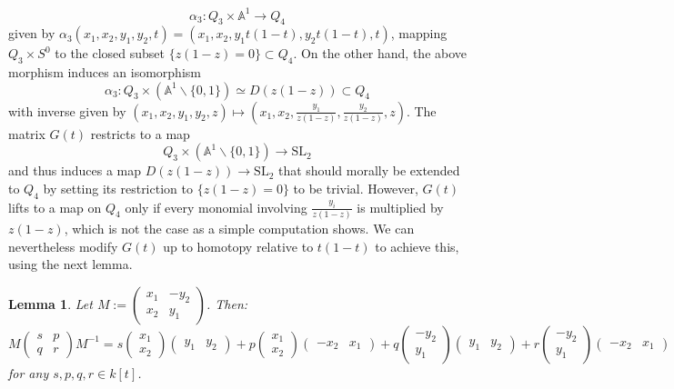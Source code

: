 \documentclass[11pt,leqno]{article}
\newcommand{\A}{{\mathbb A}}
\renewcommand{\1}{{\rm 1\hspace*{-0.4ex}%
\rule{0.1ex}{1.52ex}\hspace*{0.2ex}}}
\newcommand{\<}[1]{{\langle}#1 {\rangle}}
\theoremstyle{plain}
\newtheorem{lem}[thm]{Lemma}
\theoremstyle{definition}
\theoremstyle{remark}
\numberwithin{equation}{section}
\begin{document}
\[
\alpha_3\colon Q_3\times \A^1\to Q_4
\]
given by $\alpha_3(x_1,x_2,y_1,y_2,t)=(x_1,x_2,y_1t(1-t),y_2t(1-t),t)$, mapping $ Q_3\times S^0$ to the closed subset  $\{z(1-z)=0\}\subset Q_4$. On the other hand, the above morphism induces an isomorphism 
\[
\alpha_3\colon Q_3\times (\A^1\smallsetminus \{0,1\})\simeq D(z(1-z))\subset Q_4
\]
with inverse given by $(x_1,x_2,y_1,y_2,z)\mapsto (x_1,x_2,\frac{y_1}{z(1-z)},\frac{y_2}{z(1-z)},z)$. The matrix $G(t)$ restricts to a map
\[
Q_3\times (\A^1\smallsetminus \{0,1\})\to \mathrm{SL}_2
\]
and thus induces a map $D(z(1-z))\to \mathrm{SL}_2$ that should morally be extended to $Q_4$ by setting its restriction to $\{z(1-z)=0\}$ to be trivial. However, $G(t)$ lifts to a map on $Q_4$ only if every monomial involving $\frac{y_i}{z(1-z)}$ is multiplied by $z(1-z)$, which is not the case as a simple computation shows. We can nevertheless modify $G(t)$ up to homotopy relative to $t(1-t)$ to achieve this, using the next lemma.  

\begin{lem}
Let $M:=\begin{pmatrix} x_1 & -y_2 \\ x_2 & y_1\end{pmatrix}$. Then:
\[
M\begin{pmatrix} s & p \\ q & r\end{pmatrix}M^{-1}=s\begin{pmatrix} x_1 \\ x_2 \end{pmatrix}\begin{pmatrix} y_1 & y_2\end{pmatrix}+ p\begin{pmatrix} x_1 \\ x_2 \end{pmatrix}\begin{pmatrix} -x_2 & x_1\end{pmatrix} + q\begin{pmatrix} -y_2 \\ y_1 \end{pmatrix}\begin{pmatrix} y_1 & y_2\end{pmatrix} + r\begin{pmatrix} -y_2 \\ y_1 \end{pmatrix}\begin{pmatrix} -x_2 & x_1\end{pmatrix}
\] 
for any $s,p,q,r\in k[t]$.
\end{lem}
\end{document}
